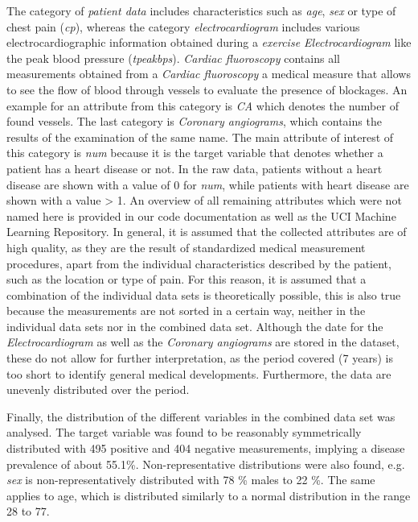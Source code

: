 The category of \textit{patient data} includes characteristics such as \textit{age}, \textit{sex} or type of chest pain (\textit{cp}), whereas the category \textit{electrocardiogram} includes various electrocardiographic information obtained during a \textit{exercise Electrocardiogram} like the peak blood pressure (\textit{tpeakbps}). \textit{Cardiac fluoroscopy} contains all measurements obtained from a \textit{Cardiac fluoroscopy} a medical measure that allows to see the flow of blood through vessels to evaluate the presence of blockages. An example for an attribute from this category is \textit{CA} which denotes the number of found vessels. The last category is \textit{Coronary angiograms}, which contains the results of the examination of the same name. The main attribute of interest of this category is \textit{num} because it is the target variable that denotes whether a patient has a heart disease or not. In the raw data, patients without a heart disease are shown with a value of 0 for \textit{num}, while patients with heart disease are shown with a value > 1. 
An overview of all remaining attributes which were not named here is provided in our code documentation as well as the UCI Machine Learning Repository\citep{janosi1988}. In general, it is assumed that the collected attributes are of high quality, as they are the result of standardized medical measurement procedures, apart from the individual characteristics described by the patient, such as the location or type of pain. For this reason, it is assumed that a combination of the individual data sets is theoretically possible, this is also true because the measurements are not sorted in a certain way, neither in the individual data sets nor in the combined data set. Although the date for the \textit{Electrocardiogram} as well as the \textit{Coronary angiograms} are stored in the dataset, these do not allow for further interpretation, as the period covered (7 years) is too short to identify general medical developments. Furthermore, the data are unevenly distributed over the period. 

Finally, the distribution of the different variables in the combined data set was analysed. The target variable was found to be reasonably symmetrically distributed with 495 positive and 404 negative measurements, implying a disease prevalence of about 55.1\%. Non-representative distributions were also found, e.g. \textit{sex} is non-representatively distributed with 78 \% males to 22 \%. The same applies to age, which is distributed similarly to a normal distribution in the range 28 to 77.  


